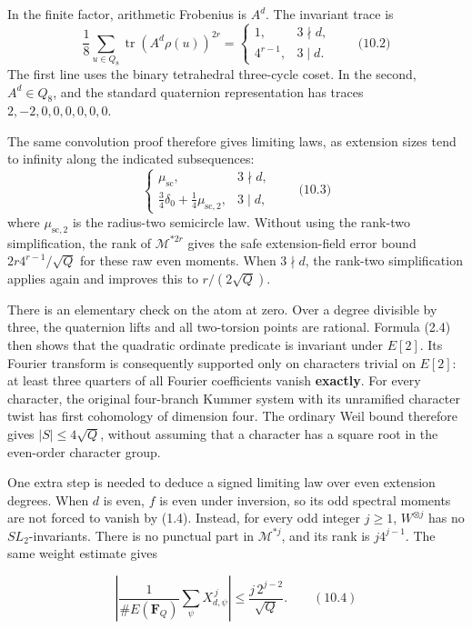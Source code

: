 \documentclass[
  11pt,
  a4paper,
]{article}
\begin{document}
In the finite factor, arithmetic Frobenius is \(A^d\). The invariant
trace is \[
\frac18\sum_{u\in Q_8}\operatorname{tr}(A^d\rho(u))^{2r}
=\begin{cases}
1,&3\nmid d,\\
4^{r-1},&3\mid d.
\end{cases}
\qquad \text{(10.2)}
\] The first line uses the binary tetrahedral three-cycle coset. In the
second, \(A^d\in Q_8\), and the standard quaternion representation has
traces \(2,-2,0,0,0,0,0,0\).

The same convolution proof therefore gives limiting laws, as extension
sizes tend to infinity along the indicated subsequences: \[
\begin{cases}
\mu_{\mathrm{sc}},&3\nmid d,\\
\displaystyle\frac34\delta_0+\frac14\mu_{{\mathrm{sc}},2},&3\mid d,
\end{cases}
\qquad \text{(10.3)}
\] where \(\mu_{{\mathrm{sc}},2}\) is the radius-two semicircle law.
Without using the rank-two simplification, the rank of
\(\mathcal M^{*2r}\) gives the safe extension-field error bound
\(2r4^{r-1}/\sqrt Q\) for these raw even moments. When \(3\nmid d\), the
rank-two simplification applies again and improves this to
\(r/(2\sqrt Q)\).

There is an elementary check on the atom at zero. Over a degree
divisible by three, the quaternion lifts and all two-torsion points are
rational. Formula (2.4) then shows that the quadratic ordinate predicate
is invariant under \(E[2]\). Its Fourier transform is consequently
supported only on characters trivial on \(E[2]\): at least three
quarters of all Fourier coefficients vanish \textbf{exactly}. For every
character, the original four-branch Kummer system with its unramified
character twist has first cohomology of dimension four. The ordinary
Weil bound therefore gives \(|S|\le4\sqrt Q\), without assuming that a
character has a square root in the even-order character group.

One extra step is needed to deduce a signed limiting law over even
extension degrees. When \(d\) is even, \(f\) is even under inversion, so
its odd spectral moments are not forced to vanish by (1.4). Instead, for
every odd integer \(j\geq1\), \(W^{\otimes j}\) has no
\(SL_2\)-invariants. There is no punctual part in \(\mathcal M^{*j}\),
and its rank is \(j4^{j-1}\). The same weight estimate gives

\[
\left|\frac{1}{\#E(\mathbf F_Q)}\sum_\psi X_{d,\psi}^{\,j}\right|
\leq\frac{j\,2^{j-2}}{\sqrt Q}. \qquad (10.4)
\]
\end{document}
